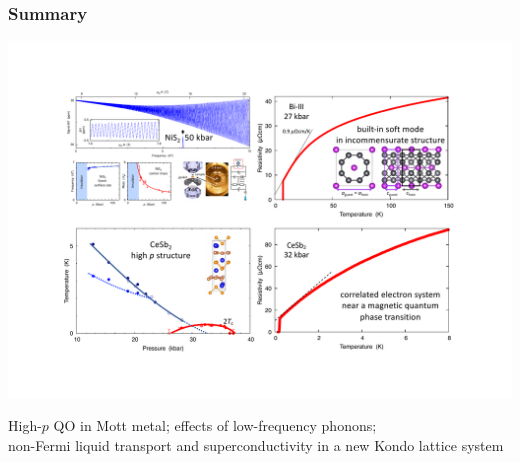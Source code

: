 

\begin{emptyframe}
\frametitle{Summary}
\centerline{\includegraphics[width=\columnwidth]{EndingPicture3.pdf}}
\begin{center}
    {\small High-$p$ QO in Mott metal; effects of low-frequency phonons; \\ non-Fermi liquid transport and superconductivity in a new Kondo lattice system}
\end{center}



\end{emptyframe}
{}

